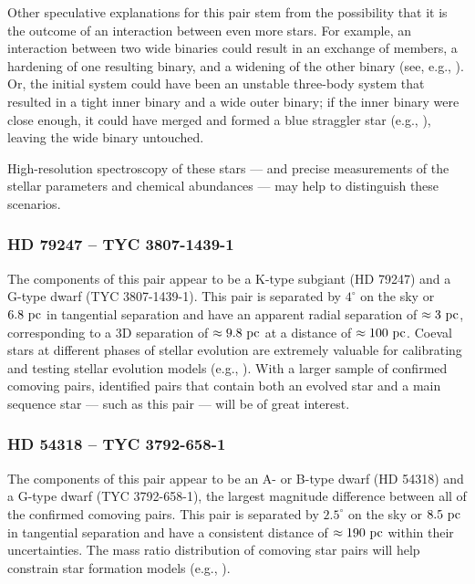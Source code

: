 \documentclass[modern, letterpaper]{aastex61}
\begin{document}
Other speculative explanations for this pair stem from the possibility that it
is the outcome of an interaction between even more stars.
For example, an interaction between two wide binaries could result in an
exchange of members, a hardening of one resulting binary, and a widening of the
other binary (see, e.g., \citealt{Leigh:2016}).
Or, the initial system could have been an unstable three-body system that
resulted in a tight inner binary and a wide outer binary;
if the inner binary were close enough, it could have merged and formed a blue
straggler star (e.g., \citealt{Naoz:2014}), leaving the wide binary untouched.

High-resolution spectroscopy of these stars --- and precise measurements of the
stellar parameters and chemical abundances --- may help to distinguish these
scenarios.

\subsubsection{HD 79247 -- TYC 3807-1439-1}

The components of this pair appear to be a K-type subgiant (HD 79247) and a
G-type dwarf (TYC 3807-1439-1).
This pair is separated by $4^\circ$ on the sky or $6.8~\mathrm{pc}$ in tangential
separation and have an apparent radial separation of $\approx 3~\mathrm{pc}$,
corresponding to a 3D separation of $\approx 9.8~\mathrm{pc}$ at a distance of $\approx
100~\mathrm{pc}$.
Coeval stars at different phases of stellar evolution are extremely valuable for
calibrating and testing stellar evolution models (e.g., \citealt{Torres:2013}).
With a larger sample of confirmed comoving pairs, identified pairs that contain
both an evolved star and a main sequence star --- such as this pair --- will be
of great interest.

\subsubsection{HD 54318 -- TYC 3792-658-1}

The components of this pair appear to be an A- or B-type dwarf (HD 54318) and a
G-type dwarf (TYC 3792-658-1), the largest magnitude difference between all of
the confirmed comoving pairs.
This pair is separated by $2.5^\circ$ on the sky or $8.5~\mathrm{pc}$ in tangential
separation and have a consistent distance of $\approx 190~\mathrm{pc}$ within their
uncertainties.
The mass ratio distribution of comoving star pairs will help constrain star
formation models (e.g., \citealt{Raghavan:2010}).
\end{document}
